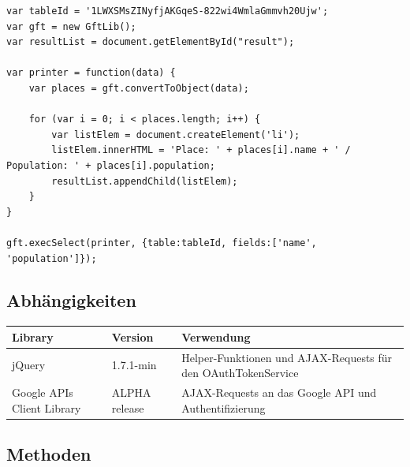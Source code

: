 \lstset{language=JavaScript}
\begin{lstlisting}
var tableId = '1LWXSMsZINyfjAKGqeS-822wi4WmlaGmmvh20Ujw';
var gft = new GftLib();
var resultList = document.getElementById("result");

var printer = function(data) {
	var places = gft.convertToObject(data);

	for (var i = 0; i < places.length; i++) {
		var listElem = document.createElement('li');
		listElem.innerHTML = 'Place: ' + places[i].name + ' / Population: ' + places[i].population;
		resultList.appendChild(listElem);
	}
}

gft.execSelect(printer, {table:tableId, fields:['name', 'population']});
\end{lstlisting}

\subsection{Abhängigkeiten}
\begin{longtable}{|l|p{2cm}|p{7cm}|}
\hline 
\textbf{Library} & \textbf{Version} & \textbf{Verwendung} \\ 
\hline 
jQuery & 1.7.1-min & Helper-Funktionen und \gls{AJAX}-Requests für den OAuthTokenService  \\ 
\hline 
Google APIs Client Library & ALPHA release & \gls{AJAX}-Requests an das Google API und Authentifizierung \\ 
\hline 
\end{longtable} 

\subsection{Methoden}
